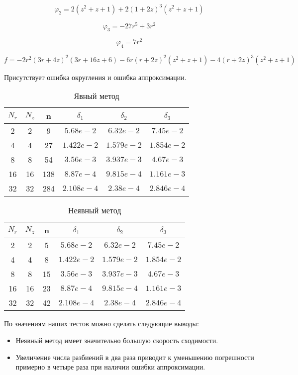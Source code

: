 \[
  \varphi_2 = 2(z^2 + z + 1) + 2(1 + 2z)^3 (z^2 + z + 1)
\]

\[
 \varphi_3 =  -27r^5 + 3r^2
\]

\[
 \varphi_4 =7r^2
\]

\[
  f = - 2 r^{2} \left(3 r + 4 z\right)^{2} \left(3 r + 16 z + 6\right) - 6 r \left(r + 2 z\right)^{2} \left(z^{2} + z + 1\right) - 4 \left(r + 2 z\right)^{3} \left(z^{2} + z + 1\right)
\]

Присутствует ошибка округления и ошибка аппроксимации.

\begin{table}[H]
  \begin{center}
    \begin{tabular}{*{6}c}
      \toprule
      $ N_r $ & $ N_z $ & n & $ \delta_1 $ & $ \delta_2 $ & $ \delta_3 $ \\
      \midrule
      2 & 2 & 9 & $5.68e-2 $ & $6.32e-2 $ & $7.45e-2 $ \\
      4 & 4 & 27 & $1.422e-2 $ & $1.579e-2 $ & $1.854e-2 $ \\
      8 & 8 & 54 & $3.56e-3 $ & $3.937e-3 $ & $4.67e-3 $ \\
      16 & 16 & 138 & $8.87e-4 $ & $9.815e-4 $ & $1.161e-3 $ \\
      32 & 32 & 284 & $2.108e-4 $ & $2.38e-4 $ & $2.846e-4 $ \\
      \bottomrule
    \end{tabular}
    \caption{Явный метод}
  \end{center}
\end{table}
  
\begin{table}[H]
  \begin{center}
    \begin{tabular}{*{6}c}
      \toprule
      $ N_r $ & $ N_z $ & n & $ \delta_1 $ & $ \delta_2 $ & $ \delta_3 $ \\
      \midrule
      2 & 2 & 5 & $5.68e-2 $ & $6.32e-2 $ & $7.45e-2 $ \\
      4 & 4 & 8 & $1.422e-2 $ & $1.579e-2 $ & $1.854e-2 $ \\
      8 & 8 & 15 & $3.56e-3 $ & $3.937e-3 $ & $4.67e-3 $ \\
      16 & 16 & 23 & $8.87e-4 $ & $9.815e-4 $ & $1.161e-3 $ \\
      32 & 32 & 42 & $2.108e-4 $ & $2.38e-4 $ & $2.846e-4 $ \\
      \bottomrule
    \end{tabular}
    \caption{Неявный метод}
  \end{center}
\end{table}

По значениям наших тестов можно сделать следующие выводы:
\begin{itemize}
  \item Неявный метод имеет значительно большую скорость сходимости.
  \item Увеличение числа разбиений в два раза приводит к уменьшению погрешности примерно в четыре раза при наличии ошибки аппроксимации.
\end{itemize}